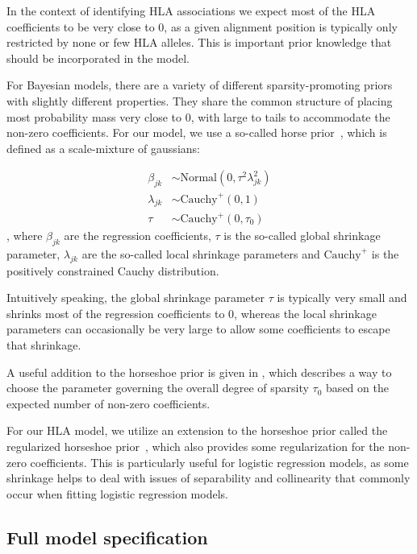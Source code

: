 \documentclass{bioinfo}
\begin{document}
\begin{methods}
In the context of identifying HLA associations we expect most of the HLA coefficients to be very close to 0, as a given alignment position is typically only restricted by none or few HLA alleles.
This is important prior knowledge that should be incorporated in the model.

For Bayesian models, there are a variety of different sparsity-promoting priors with slightly different properties. They share the common structure of placing most probability mass very close to 0, with large to tails to accommodate the non-zero coefficients.
For our model, we use a so-called horse prior~\citep{Carvalho2010}, which is defined as a scale-mixture of gaussians:

\begin{equation}
  \begin{aligned}
    \beta_{jk} &\sim \text{Normal}(0, \tau^{2}\lambda^{2}_{jk}) \\
    \lambda_{jk} &\sim \text{Cauchy}^{+}(0, 1) \\
    \tau &\sim \text{Cauchy}^{+}(0, \tau_{0})
  \end{aligned}
\end{equation},
where \(\beta_{jk}\) are the regression coefficients, \(\tau\) is the so-called global shrinkage parameter, \(\lambda_{jk}\) are the so-called local shrinkage parameters and \(\text{Cauchy}^{+}\) is the positively constrained Cauchy distribution.

Intuitively speaking, the global shrinkage parameter \(\tau\) is typically very small and shrinks most of the regression coefficients to 0, whereas the local shrinkage parameters can occasionally be very large to allow some coefficients to escape that shrinkage.

A useful addition to the horseshoe prior is given in \citet{Piironen2017}, which describes a way to choose the parameter governing the overall degree of sparsity \(\tau_{0}\) based on the expected number of non-zero coefficients. 

For our HLA model, we utilize an extension to the horseshoe prior called the regularized horseshoe prior~\citep{Piironen2017}, which also provides some regularization for the non-zero coefficients. This is particularly useful for logistic regression models, as some shrinkage helps to deal with issues of separability and collinearity that commonly occur when fitting logistic regression models.

\subsection{Full model specification}


\end{methods}
\end{document}
